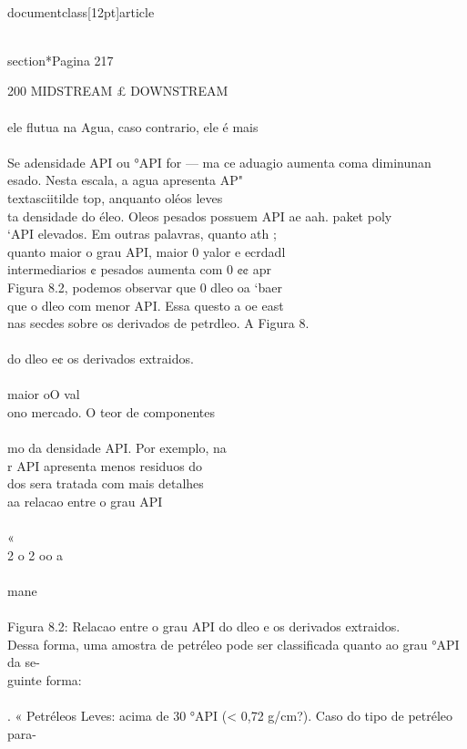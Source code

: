 \\documentclass[12pt]{article}
\begin{document}
\\section*{Pagina 217}

200 MIDSTREAM £ DOWNSTREAM\\
\\
ele flutua na Agua, caso contrario, ele é mais\\
\\
Se adensidade API ou °API for — ma ce aduagio aumenta coma diminunan\\
esado. Nesta escala, a agua apresenta AP" \\textasciitilde{} top, anquanto oléos leves\\
ta densidade do éleo. Oleos pesados possuem API ae aah. paket poly\\
‘API elevados. Em outras palavras, quanto ath ;\\
quanto maior o grau API, maior 0 yalor e ecrdadl\\
intermediarios ¢ pesados aumenta com 0 ¢¢ apr\\
Figura 8.2, podemos observar que 0 dleo oa ‘baer\\
que o dleo com menor API. Essa questo a oe east\\
nas secdes sobre os derivados de petrdleo. A Figura 8.\\
\\
do dleo e¢ os derivados extraidos.\\
\\
maior oO val\\
ono mercado. O teor de componentes\\
\\
mo da densidade API. Por exemplo, na\\
r API apresenta menos residuos do\\
dos sera tratada com mais detalhes\\
aa relacao entre o grau API\\
\\
«\\
2 o 2 oo a\\
\\
mane\\
\\
Figura 8.2: Relacao entre o grau API do dleo e os derivados extraidos.\\
Dessa forma, uma amostra de petréleo pode ser classificada quanto ao grau °API da se-\\
guinte forma:\\
\\
. « Petréleos Leves: acima de 30 °API (< 0,72 g/cm?). Caso do tipo de petréleo para-\\
\end{document}
